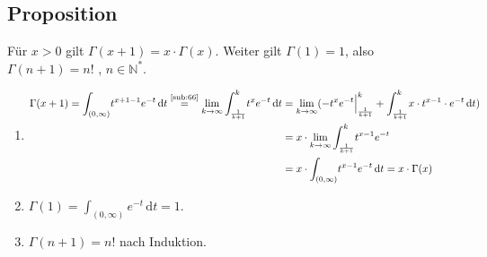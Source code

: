 \subsection[Proposition: Rekursionsformel der Gammafunktion]{Proposition} %
\label{sub:77}
Für $x>0$ gilt $\Gamma(x+1)= x \cdot \Gamma(x)$. Weiter gilt $\Gamma(1)=1$, also $\Gamma(n+1)= n!$ , $n \in \mathds{N}^*$.
\begin{enumerate}[1.)]
	\item \begin{align*}
		\Gamma(x+1) = \int_{(0,\infty)}\! t^{x+1-1} e^{-t}  \, \mathrm{d}t \stackrel{\text{\ref{sub:66}}}{=} \lim_{ k \to \infty} \int_{\frac{1}{k+1} } ^{k} \! 
		t^{x} e^{-t}  \, \mathrm{d}t &= \lim_{ k \to \infty} (-t^x e^{-t} \Big|_{\frac{1}{k+1} }^k + \int_{\frac{1}{k+1} } ^{k} \! x \cdot t^{x-1} 
		\cdot e^{-t}  \, \mathrm{d}t) \\
		&= x \cdot \lim_{ k \to \infty} \int_{\frac{1}{k+1} } ^{k} \! t^{x-1} e^{-t}\\
		&= x \cdot \int_{(0,\infty)}\! t^{x-1} e^{-t}  \, \mathrm{d}t = x \cdot \Gamma(x)
	\end{align*}
	\item $\Gamma(1)= \int_{(0,\infty)}e^{-t}  \, \mathrm{d}t =1$.
	\item $\Gamma(n+1)=n!$ nach Induktion. \bewende
\end{enumerate}

